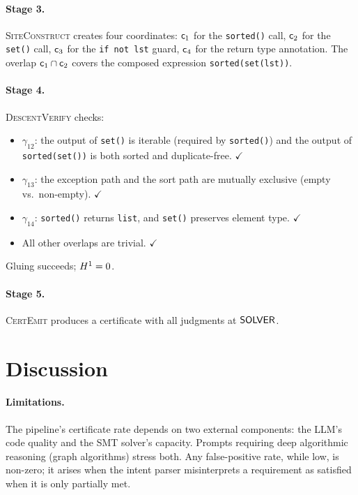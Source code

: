 \documentclass[11pt]{article}
\newcommand{\Cocycle}{\gamma}
\newcommand{\SiteConstruct}{\textsc{SiteConstruct}}
\newcommand{\DescentVerify}{\textsc{DescentVerify}}
\newcommand{\CertEmit}{\textsc{CertEmit}}
\begin{document}
\paragraph{Stage 3.}
\SiteConstruct{} creates four coordinates: $\mathsf{c}_1$ for the
\texttt{sorted()} call, $\mathsf{c}_2$ for the \texttt{set()} call,
$\mathsf{c}_3$ for the \texttt{if not lst} guard, $\mathsf{c}_4$ for
the return type annotation.  The overlap
$\mathsf{c}_1 \cap \mathsf{c}_2$ covers the composed expression
\texttt{sorted(set(lst))}.

\paragraph{Stage 4.}
\DescentVerify{} checks:
\begin{itemize}[noitemsep]
  \item $\Cocycle_{12}$: the output of \texttt{set()} is iterable
    (required by \texttt{sorted()}) and the output of
    \texttt{sorted(set())} is both sorted and duplicate-free.
    $\checkmark$
  \item $\Cocycle_{13}$: the exception path and the sort path are
    mutually exclusive (empty vs.\ non-empty). $\checkmark$
  \item $\Cocycle_{14}$: \texttt{sorted()} returns \texttt{list},
    and \texttt{set()} preserves element type. $\checkmark$
  \item All other overlaps are trivial. $\checkmark$
\end{itemize}
Gluing succeeds; $H^{1} = 0$.

\paragraph{Stage 5.}
\CertEmit{} produces a certificate with all
judgments at $\mathsf{SOLVER}$.

\section{Discussion}\label{sec:discussion}

\paragraph{Limitations.}
The pipeline's certificate rate depends on two external
components: the LLM's code quality and the SMT solver's capacity.
Prompts requiring deep algorithmic reasoning (\eg graph algorithms)
stress both.  Any false-positive rate, while low,
is non-zero; it arises when the intent parser misinterprets a
requirement as satisfied when it is only partially met.
\end{document}
